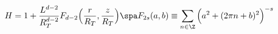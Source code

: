 \begin{equation}
H = 1 + \frac{L^{d-2}}{R_T^{d-2}}
F_{d-2} \Big( \frac{r}{R_T} , \frac{z}{R_T} \Big) \spa
F_{2s} (a,b) \equiv \sum_{n\in \Z} \Big( a^2 + (2\pi n + b)^2 \Big)^{-s}
\end{equation}

